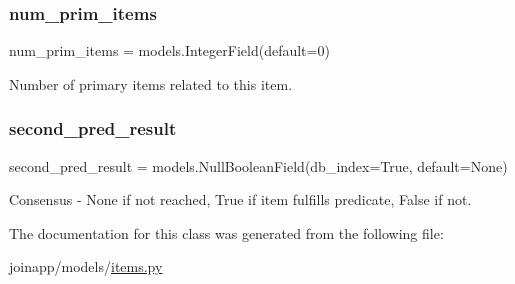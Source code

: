 \mbox{\label{classjoinapp_1_1models_1_1items_1_1_secondary_item_aec90ed47b1ec4ae92dd1b073b2f6b4a6}} 
\subsubsection{\texorpdfstring{num\_prim\_items}{num\_prim\_items}}
{\footnotesize\ttfamily num\+\_\+prim\+\_\+items = models.\+Integer\+Field(default=0)\hspace{0.3cm}{\ttfamily [static]}}



Number of primary items related to this item. 

\mbox{\label{classjoinapp_1_1models_1_1items_1_1_secondary_item_ad5707a6b437363484fc3db60e325a970}} 
\subsubsection{\texorpdfstring{second\_pred\_result}{second\_pred\_result}}
{\footnotesize\ttfamily second\+\_\+pred\+\_\+result = models.\+Null\+Boolean\+Field(db\+\_\+index=True, default=None)\hspace{0.3cm}{\ttfamily [static]}}



Consensus -\/ None if not reached, True if item fulfills predicate, False if not. 



The documentation for this class was generated from the following file\+:\begin{DoxyCompactItemize}
\item 
joinapp/models/\mbox{\hyperlink{items_8py}{items.\+py}}\end{DoxyCompactItemize}
